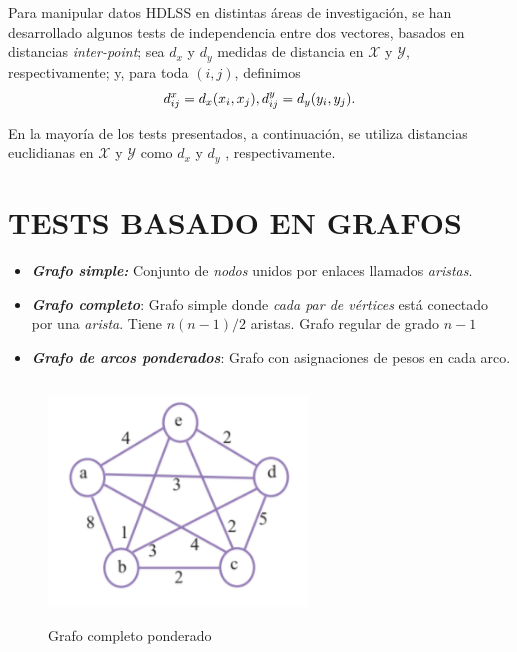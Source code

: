 \documentclass[]{book}
\begin{document}
Para manipular datos HDLSS en distintas áreas de investigación, se han
desarrollado algunos tests de independencia entre dos vectores, basados
en distancias \emph{inter-point}; sea \(d_{x}\) y \(d_{y}\) medidas de
distancia en \(\mathcal{X}\) y \(\mathcal{Y}\), respectivamente; y, para
toda \((i,j)\), definimos
\[ d_{ij}^x = d_x(x_i, x_j), \\ d_{ij}^y = d_y(y_i, y_j). \]

En la mayoría de los tests presentados, a continuación, se utiliza
distancias euclidianas en \(\mathcal{X}\) y \(\mathcal{Y}\) como
\(d_{x}\) y \(d_{y}\) , respectivamente.

\chapter{TESTS BASADO EN GRAFOS}\label{tests-basado-en-grafos}

\begin{itemize}
\item
  \textbf{\emph{Grafo simple:}} Conjunto de \emph{nodos} unidos por
  enlaces llamados \emph{aristas}.
\item
  \textbf{\emph{Grafo completo}}: Grafo simple donde \emph{cada par de
  vértices} está conectado por una \emph{arista}. Tiene \(n(n-1)/2\)
  aristas. Grafo regular de grado \(n-1\)
\item
  \textbf{\emph{Grafo de arcos ponderados}}: Grafo con asignaciones de
  pesos en cada arco.
\end{itemize}

\begin{figure}

{\centering \includegraphics[width=260,height=240]{grafo_completo} 

}

\caption{Grafo completo ponderado}\label{fig:unnamed-chunk-1}
\end{figure}
\end{document}
